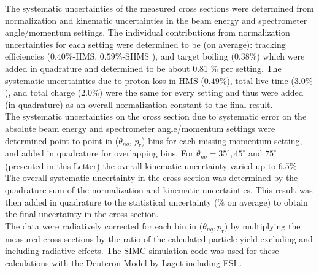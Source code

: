 \indent The systematic uncertainties of the measured cross sections were determined from 
normalization and kinematic uncertainties in the beam energy and spectrometer angle/momentum settings. The individual
contributions from normalization uncertainties for each setting were determined to be (on average): tracking efficiencies ($0.40 \%$-HMS, $0.59 \%$-SHMS ),
and target boiling ($0.38 \%$) which were added in quadrature and determined to be about 0.81 $\%$ per setting. The systematic uncertainties due to
proton loss in HMS ($0.49 \%$), total live time ($3.0 \%$), and total charge ($2.0\%$) were the same for every setting and thus were added (in quadrature)
as an overall normalization constant to the final result.\\
\indent The systematic uncertainties on the cross section due to systematic error on the absolute beam energy and spectrometer angle/momentum settings were
determined point-to-point in ($\theta_{nq}$, $p_{\mathrm{r}}$) bins for each missing momentum setting, and added in quadrature for overlapping \DIFdelbegin {}\DIFdelend \DIFaddbegin {}\DIFaddend bins. 
For $\theta_{nq}= 35^{\circ}, 45^{\circ}$ and $75^{\circ}$ (presented in this Letter) the overall kinematic uncertainty varied up to 6.5$\%$.
The overall systematic uncertainty in the cross section was determined by the quadrature sum of the normalization and kinematic uncertainties. This result was then added in quadrature
to the statistical uncertainty (\DIFdelbegin {}\DIFdelend \DIFaddbegin {}\DIFaddend $\%$ on average) to obtain the final uncertainty in the cross section. \\
\indent The data were radiatively corrected for each bin in ($\theta_{nq}, p_{\mathrm{r}}$) by multiplying the measured cross sections by the ratio of the calculated particle yield excluding and including radiative effects. The SIMC simulation code was used for these calculations with the Deuteron Model by Laget including FSI \cite{LAGET2005}.
